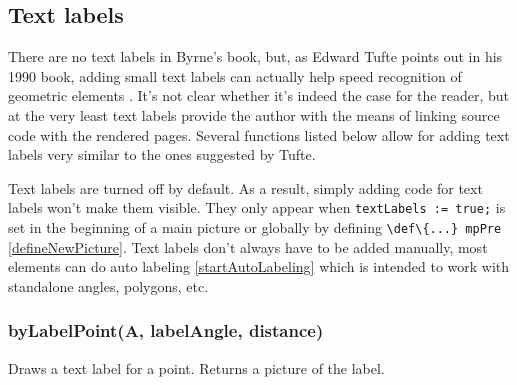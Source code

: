 




\subsection{Text labels}\label{textlabels}

There are no text labels in Byrne's book, but, as Edward Tufte points out in his 1990 book, adding small text labels can actually help speed recognition of geometric elements \cite{Tufte90}. It's not clear whether it's indeed the case for the reader, but at the very least text labels provide the author with the means of linking source code with the rendered pages. Several functions listed below allow for adding text labels very similar to the ones suggested by Tufte.

Text labels are turned off by default. As a result, simply adding code for text labels won't make them visible. They only appear when \texttt{textLabels := true;} is set in the beginning of a main picture or globally by defining \texttt{\textbackslash def\textbackslash\{...\} mpPre} \ref{defineNewPicture}. Text labels don't always have to be added manually, most elements can do auto labeling \ref{startAutoLabeling} which is intended to work with standalone angles, polygons, etc. 


\subsubsection{byLabelPoint(A, labelAngle, distance)}\label{byLabelPoint}
Draws a text label for a point. Returns a picture of the label.
	
